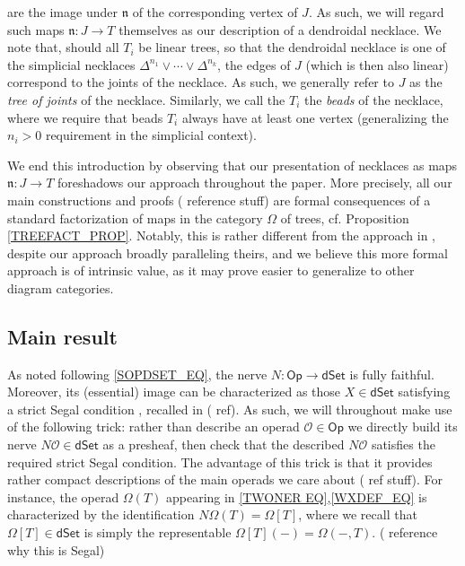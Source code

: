 \documentclass[a4paper,10pt
,draft
]{article}%
\numberwithin{equation}{section}
\numberwithin{figure}{section}
\theoremstyle{definition} %
\renewcommand{\O}{\ensuremath{\mathcal O}}
\newcommand{\1}{\ensuremath{\mathbbm 1}}%
\begin{document}
are the image under $\mathfrak{n}$
of the corresponding vertex of $J$.
As such, we will regard such maps 
$\mathfrak{n} \colon J \to T$
themselves as our description of a dendroidal necklace.
We note that, should all $T_i$ be linear trees, so that the dendroidal necklace is one of the simplicial necklaces
$\Delta^{n_1} \vee \cdots \vee \Delta^{n_k}$,
the edges of $J$ (which is then also linear) correspond to the joints of the necklace. As such, we generally refer to $J$ as the 
\emph{tree of joints} of the necklace. Similarly, we call the $T_i$ the \emph{beads} of the necklace, where we require that beads $T_i$ always have at least one vertex (generalizing the $n_i>0$ requirement in the simplicial context).

We end this introduction by observing that our presentation of necklaces as maps $\mathfrak{n} \colon J \to T$
foreshadows our approach throughout the paper.
More precisely, all our main constructions and proofs {(\color{red} reference stuff)}
are formal consequences of a standard factorization of maps in the category $\Omega$ of trees, cf. Proposition \ref{TREEFACT_PROP}.
Notably, this is rather different from the approach in \cite{DS11},
despite our approach broadly paralleling theirs,
and we believe this more formal approach is of intrinsic value,
as it may prove easier to generalize to other diagram categories.




\subsection{Main result}


As noted following \eqref{SOPDSET_EQ},
the nerve $N\colon \mathsf{Op} \to \mathsf{dSet}$
is fully faithful.
Moreover, its (essential) image
can be characterized as those 
$X \in \mathsf{dSet}$ satisfying a strict Segal condition
\cite[Prop. 5.3 and Thm. 6.1]{MW09},
recalled in {(\color{red} ref)}.
As such, we will throughout make use of the following trick:
rather than describe an operad $\O \in \mathsf{Op}$
we directly build its nerve 
$N\O \in \mathsf{dSet}$ as a presheaf,
then check that the described $N\O$ satisfies the required strict Segal condition.
The advantage of this trick is that it provides rather compact descriptions of the main operads we care about ({\color{red} ref stuff}).
For instance, 
the operad $\Omega(T)$ appearing in 
\eqref{TWONER EQ},\eqref{WXDEF_EQ}
is characterized by the identification $N\Omega(T) =\Omega[T]$, 
where we recall that $\Omega[T]\in \mathsf{dSet}$
is simply the representable $\Omega[T](-) = \Omega(-,T)$.
{(\color{red} reference why this is Segal)}
\end{document}
